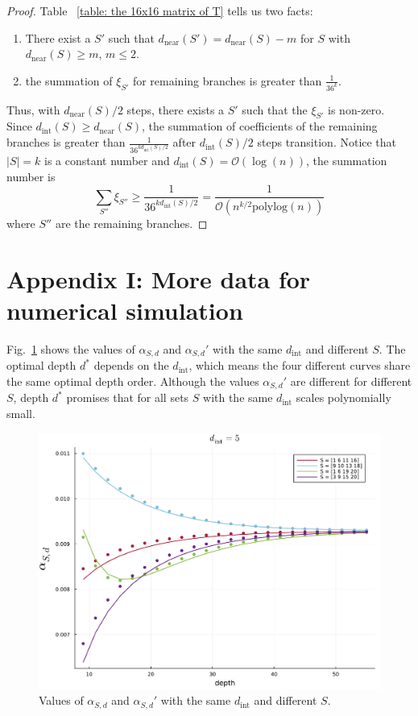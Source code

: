 \documentclass[journal=jctcce,a4paper,manuscript=article]{achemso}
\newcommand{\polylog}{\mathrm{polylog}}
\begin{document}
\begin{proof}
  Table ~\ref{table: the 16x16 matrix of T} tells us two facts:
  \begin{enumerate}
    \item There exist a $S'$ such that $d_\text{near}(S')= d_\text{near}(S)-m$ for $S$
          with $d_\text{near}(S) \geq m$, $m\leq 2$.
    \item the summation of $\xi_{S'}$ for remaining branches is greater than
          $\frac{1}{36^{k}}$.
  \end{enumerate}
  Thus, with $d_\text{near}(S)/2$ steps, there exists a $S'$ such that the $\xi_{S'}$ is non-zero. Since $d_\text{int}(S)\geq d_\text{near}(S)$, the summation of coefficients of the remaining branches is greater than $\frac{1}{36^{k d_\text{int}(S)/2}}$ after $d_\text{int}(S)/2$ steps transition. Notice that $|S| = k$ is a constant number and $d_\text{int}(S) = \mathcal{O}(\log(n))$, the summation number is
  \begin{equation}
    \sum_{S''} \xi_{S''} \geq  \frac{1}{36^{k d_\text{int}(S)/2}} = \frac{1}{\mathcal{O}(n^{k/2} \polylog(n))}
  \end{equation}
  where $S''$ are the remaining branches.
\end{proof}

\section{Appendix I: More data for numerical simulation}

Fig.~\ref{fig: fix dint} shows the values of $\alpha_{S,d}$ and $\alpha_{S,d}'$
with the same $d_\text{int}$ and different $S$. The optimal depth $d^\ast$
depends on the $d_\text{int}$, which means the four different curves share the
same optimal depth order. Although the values $\alpha_{S,d}'$ are different for
different $S$, depth $d^\ast$ promises that for all sets $S$ with the same
$d_\text{int}$ scales polynomially small.

\label{appendix: numerical simulation}

\begin{figure}[ht]
  \centering
  \includegraphics[width=0.8\linewidth]{figures/appendix/fix_dint.pdf}
  \caption{ Values of $\alpha_{S,d}$ and $\alpha_{S,d}'$ with the same $d_\text{int}$ and different $S$.}
  \label{fig: fix dint}
\end{figure}
\end{document}
